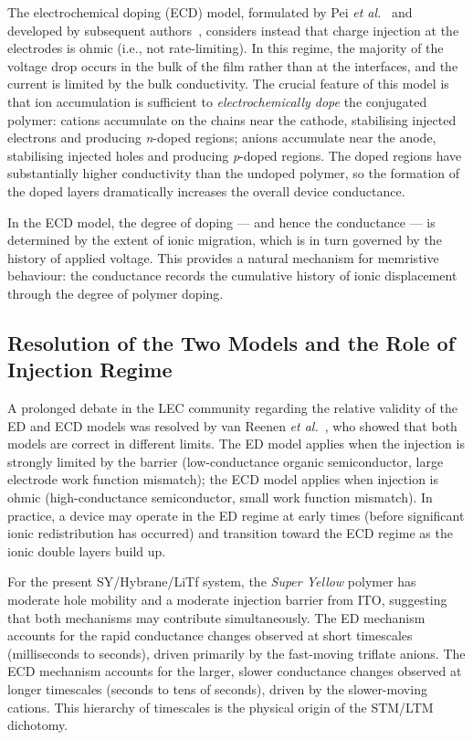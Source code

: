 \documentclass[12pt, a4paper, twoside]{report}
\newcommand{\SY}{\textit{Super Yellow}}
\begin{document}
The electrochemical doping (ECD) model, formulated by Pei \textit{et al.}~\cite{Pei1995} and developed by subsequent authors~\cite{Smith1997, Matyba2009}, considers instead that charge injection at the electrodes is ohmic (i.e., not rate-limiting). In this regime, the majority of the voltage drop occurs in the bulk of the film rather than at the interfaces, and the current is limited by the bulk conductivity. The crucial feature of this model is that ion accumulation is sufficient to \textit{electrochemically dope} the conjugated polymer: cations accumulate on the chains near the cathode, stabilising injected electrons and producing \textit{n}-doped regions; anions accumulate near the anode, stabilising injected holes and producing \textit{p}-doped regions. The doped regions have substantially higher conductivity than the undoped polymer, so the formation of the doped layers dramatically increases the overall device conductance.

In the ECD model, the degree of doping — and hence the conductance — is determined by the extent of ionic migration, which is in turn governed by the history of applied voltage. This provides a natural mechanism for memristive behaviour: the conductance records the cumulative history of ionic displacement through the degree of polymer doping.

\subsection{Resolution of the Two Models and the Role of Injection Regime}\label{subsec:model_resolution}

A prolonged debate in the LEC community regarding the relative validity of the ED and ECD models was resolved by van Reenen \textit{et al.}~\cite{vanReenen2010}, who showed that both models are correct in different limits. The ED model applies when the injection is strongly limited by the barrier (low-conductance organic semiconductor, large electrode work function mismatch); the ECD model applies when injection is ohmic (high-conductance semiconductor, small work function mismatch). In practice, a device may operate in the ED regime at early times (before significant ionic redistribution has occurred) and transition toward the ECD regime as the ionic double layers build up.

For the present SY/Hybrane/LiTf system, the \SY{} polymer has moderate hole mobility and a moderate injection barrier from ITO, suggesting that both mechanisms may contribute simultaneously. The ED mechanism accounts for the rapid conductance changes observed at short timescales (milliseconds to seconds), driven primarily by the fast-moving triflate anions. The ECD mechanism accounts for the larger, slower conductance changes observed at longer timescales (seconds to tens of seconds), driven by the slower-moving  cations. This hierarchy of timescales is the physical origin of the STM/LTM dichotomy.
\end{document}
